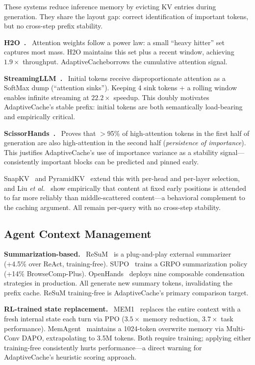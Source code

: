 \documentclass[letterpaper,twocolumn,10pt]{article}
\newcommand{\sysname}{AdaptiveCache}
\newcommand{\para}[1]{\smallskip\noindent\textbf{#1.}\ }
\newcommand{\etal}{\textit{et al.}}
\begin{document}
These systems reduce inference memory by evicting KV entries during generation.
They share the layout gap: correct identification of important tokens, but no
cross-step prefix stability.

\para{H2O~\cite{zhang2023h2o}} Attention weights follow a power law: a small
``heavy hitter'' set captures most mass. H2O maintains this set plus a
recent window, achieving $1.9\times$ throughput. \sysname borrows the
cumulative attention signal.

\para{StreamingLLM~\cite{xiao2024streamingllm}} Initial tokens receive
disproportionate attention as a SoftMax dump (``attention sinks''). Keeping
4 sink tokens + a rolling window enables infinite streaming at $22.2\times$
speedup. This doubly motivates \sysname's stable prefix: initial tokens are
both semantically load-bearing and empirically critical.

\para{ScissorHands~\cite{liu2023scissorhands}} Proves that $>$95\% of
high-attention tokens in the first half of generation are also high-attention
in the second half (\emph{persistence of importance}). This justifies
\sysname's use of importance variance as a stability signal---consistently
important blocks can be predicted and pinned early.

SnapKV~\cite{li2024snapkv} and PyramidKV~\cite{cai2024pyramidkv} extend this
with per-head and per-layer selection, and Liu \etal~\cite{liu2023lostinmiddle}
show empirically that content at fixed early positions is attended to far
more reliably than middle-scattered content---a behavioral complement to the
caching argument. All remain per-query with no cross-step stability.

\subsection{Agent Context Management}

\para{Summarization-based} ReSuM~\cite{wu2025resum} is a plug-and-play
external summarizer (+4.5\% over ReAct, training-free). SUPO~\cite{lu2025supo}
trains a GRPO summarization policy (+14\% BrowseComp-Plus).
OpenHands~\cite{openhands2025} deploys nine composable condensation strategies
in production. All generate new summary tokens, invalidating the prefix cache.
ReSuM training-free is \sysname's primary comparison target.

\para{RL-trained state replacement} MEM1~\cite{zhou2025mem1} replaces the
entire context with a fresh internal state each turn via PPO ($3.5\times$
memory reduction, $3.7\times$ task performance). MemAgent~\cite{yu2025memagent}
maintains a 1024-token overwrite memory via Multi-Conv DAPO, extrapolating to
3.5M tokens. Both require training; applying either training-free consistently
hurts performance---a direct warning for \sysname's heuristic scoring approach.
\end{document}
